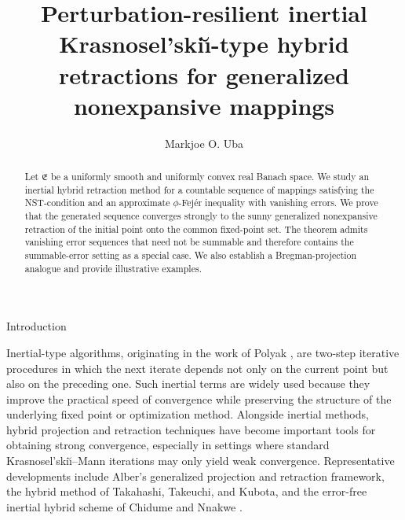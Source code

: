 \documentclass[leqno,12pt]{amsart}
\makeatletter
\theoremstyle{definition}
\theoremstyle{remark}
\numberwithin{equation}{section}
\newcommand{\E}{\mathfrak{E}}
\def\section{\@startsection{section}{1}%
  \z@{.7\linespacing\@plus\linespacing}{.5\linespacing}%
  {\normalfont\bfseries\centering}}
\makeatother
\begin{document}
\title[Perturbation-resilient inertial hybrid retractions]
{Perturbation-resilient inertial Krasnosel'ski\u\i-type hybrid retractions for generalized nonexpansive mappings}

\author[Markjoe O. Uba]{Markjoe O. Uba}


\begin{abstract}
Let $\E$ be a uniformly smooth and uniformly convex real Banach space.
We study an inertial hybrid retraction method for a countable sequence of
mappings satisfying the NST-condition and an approximate $\phi$-Fej\'er
inequality with vanishing errors. We prove that the generated sequence
converges strongly to the sunny generalized nonexpansive retraction of the initial point onto the common fixed-point set. The theorem admits vanishing error sequences that need not be summable and therefore contains the summable-error setting as a special case. We also establish a
Bregman-projection analogue and provide illustrative examples.
\end{abstract}

\maketitle
\enlargethispage{2pt}

\section{Introduction}

Inertial-type algorithms, originating in the work of Polyak \cite{Polyak1964},
are two-step iterative procedures in which the next iterate depends not only on
the current point but also on the preceding one. Such inertial terms are widely
used because they improve the practical speed of convergence while
preserving the structure of the underlying fixed point or optimization method.
Alongside inertial methods, hybrid projection and retraction techniques have
become important tools for obtaining strong convergence, especially in settings
where standard Krasnosel'ski\u\i--Mann iterations may only yield weak convergence.
Representative developments include Alber's generalized projection and
retraction framework, the hybrid method of Takahashi, Takeuchi, and Kubota,
and the error-free inertial hybrid scheme of Chidume and Nnakwe
\cite{Alber1996,TakahashiTakeuchiKubota2008,ChidumeNnakwe2020}.
\end{document}
